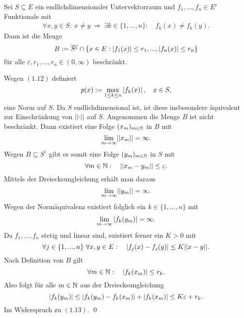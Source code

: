 \begin{lemma}
    Sei $S \subseteq E$ ein endlichdimensionaler Untervektorraum und $f_1,...,f_n \in E'$ Funktionale mit 
    \begin{align}
        \forall x,y \in S: \ x \neq y \ \Rightarrow \ \exists k \in \{1,...,n\}: \quad f_k(x) \neq f_k(y).
    \end{align}
    Dann ist die Menge 
    $$
        B := \overline{S^{\varepsilon}} \cap \{x \in E: \left| f_1(x) \right| \leq r_1,...,\left| f_n(x) \right|\leq r_n\}
    $$
    für alle $\varepsilon, r_1,...,r_n \in (0, \infty)$ beschränkt. 
\end{lemma}

\begin{proof*}
    Wegen $(1.12)$ definiert 
    $$
        p(x) := \max_{1\leq k \leq n} \left| f_k(x) \right|, \quad x \in S,
    $$
    eine Norm auf $S$. Da $S$ endlichdimensional ist, ist diese insbesondere äquivalent zur Einschränkung von $\lvert\lvert \cdot \rvert\rvert$ auf $S$. 
    Angenommen die Menge $B$ ist nicht beschränkt. Dann existiert eine Folge $(x_m)_{m \in \mathbb{N}}$ in $B$ mit 
    $$
        \lim_{m \to \infty} \lvert\lvert x_m \rvert\rvert = \infty. 
    $$
    Wegen $B \subseteq \overline{S^{\varepsilon}}$ gibt es somit eine Folge $(y_m)_{m \in \mathbb{N}}$ in $S$ mit 
    $$
        \forall m \in \mathbb{N}: \quad \lvert\lvert x_m - y_m \rvert\rvert \leq \varepsilon. 
    $$
    Mittels der Dreiecksungleichung erhält man daraus
    $$
        \lim_{m \to \infty}\lvert\lvert y_m \rvert\rvert = \infty. 
    $$
    Wegen der Normäquivalenz existiert folglich ein $k \in \{1,...,n\}$ mit 
    \begin{align}
        \lim_{m \to \infty}\left| f_k(y_m) \right| = \infty. 
    \end{align}
    Da $f_1,...,f_n$ stetig und linear sind, existiert ferner ein $K > 0$ mit 
    $$
        \forall j \in \{1,...,n\} \ \forall x,y \in E: \quad \left| f_j(x)-f_j(y) \right| \leq K \lvert\lvert x-y \rvert\rvert. 
    $$
    Nach Definition von $B$ gilt 
    $$
        \forall m \in \mathbb{N}: \quad \left| f_k(x_m) \right| \leq r_k.
    $$
    Also folgt für alle $m \in \mathbb{N}$ aus der Dreiecksungleichung
    $$
        \left| f_k(y_m) \right| \leq \left| f_k(y_m) - f_k(x_m) \right| + \left| f_k(x_m) \right| \leq K \varepsilon + r_k. 
    $$
    Im Widerspruch zu $(1.13)$. \qed
\end{proof*}

